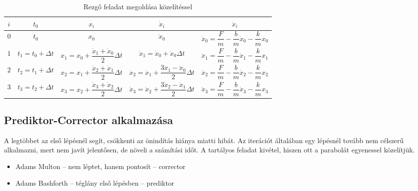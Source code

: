 \documentclass[../../main.tex]{subfiles}
\begin{document}
\bgroup
\def\arraystretch{2}
\setlength{\arrayrulewidth}{1pt}
\begin{table}[H]
  \small
  \centering\begin{tabular}{|*{5}{c|}}
    \hline
    \rowcolor{yellow!70!gray}
    $i$ & $t_0$                  & $x_i$                                                 & $\dot x_i$                                                         & $\ddot x_i$
    \\ \hline
    $0$ & $t_0$                  & $x_0$                                                 & $\dot x_0$                                                         & $\ddot x_0 = \dfrac{F}{m} - \dfrac{b}{m} \dot x_0 - \dfrac{k}{m} x_0$
    \\[1mm]  \rowcolor{gray!10}
    $1$ & $t_1 = t_0 + \Delta t$ & $x_1 = x_0 + \dfrac{\dot x_1 + \dot x_0}{2} \Delta t$ & $\dot x_1 = \dot x_0 + \ddot x_0 \Delta t$                         & $\ddot x_1 = \dfrac{F}{m} - \dfrac{b}{m} \dot x_1 - \dfrac{k}{m} x_1$
    \\[1mm]
    $2$ & $t_2 = t_1 + \Delta t$ & $x_2 = x_1 + \dfrac{\dot x_2 + \dot x_1}{2} \Delta t$ & $\dot x_2 = \dot x_1 + \dfrac{3\ddot x_1 - \ddot x_0}{2} \Delta t$ & $\ddot x_2 = \dfrac{F}{m} - \dfrac{b}{m} \dot x_2 - \dfrac{k}{m} x_2$
    \\[1mm]  \rowcolor{gray!10}
    $3$ & $t_3 = t_2 + \Delta t$ & $x_3 = x_2 + \dfrac{\dot x_3 + \dot x_2}{2} \Delta t$ & $\dot x_3 = \dot x_2 + \dfrac{3\ddot x_2 - \ddot x_1}{2} \Delta t$ & $\ddot x_3 = \dfrac{F}{m} - \dfrac{b}{m} \dot x_3 - \dfrac{k}{m} x_3$
    \\[1mm] \hline
  \end{tabular}
  \caption{Rezgő feladat megoldása közelítéssel}
  \label{fig:int2}
\end{table}
\egroup

\subsection{Prediktor-Corrector alkalmazása}

A legtöbbet az első lépésnél segít, csökkenti az önindítás hiánya miatti hibát.
Az iterációt általában egy lépésnél tovább nem célszerű alkalmazni, mert nem
javít jelentősen, de növeli a számítási időt. A tartályos feladat kivétel,
hiszen ott a parabolát egyenessel közelítjük.
\begin{itemize}
  \item Adams Multon -- nem léptet, hanem pontosít -- corrector
  \item Adams Bashforth -- téglány első lépésben -- prediktor
\end{itemize}
\end{document}
